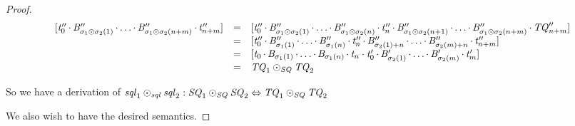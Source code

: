 \documentclass[acmsmall]{acmart}
\begin{document}
\begin{proof}
  \[
    \begin{array}{rcl}
      \SequenceOf{\StringAlt_0'' \SeqSep \AtomAlt_{\ConcatPermutationOf{\sigma_1}{\sigma_2}(1)}'' \SeqSep \ldots \SeqSep 
      \AtomAlt_{\ConcatPermutationOf{\sigma_1}{\sigma_2}(n+m)}'' \SeqSep \StringAlt_{n+m}''}
      & = &
            \SequenceOf{\StringAlt_0'' \SeqSep \AtomAlt_{\ConcatPermutationOf{\sigma_1}{\sigma_2}(1)}'' \SeqSep 
            \ldots \SeqSep \AtomAlt_{\ConcatPermutationOf{\sigma_1}{\sigma_2}(n)}'' \SeqSep 
            \StringAlt_n'' \SeqSep \AtomAlt_{\ConcatPermutationOf{\sigma_1}{\sigma_2}(n+1)}'' \SeqSep 
            \ldots \SeqSep 
            \AtomAlt_{\ConcatPermutationOf{\sigma_1}{\sigma_2}(n+m)}'' \SeqSep \SequenceAlt_{n+m}''}\\
      & = &
            \SequenceOf{\StringAlt_0'' \SeqSep \AtomAlt_{\sigma_1(1)}'' \SeqSep 
            \ldots \SeqSep \AtomAlt_{\sigma_1(n)}'' \SeqSep 
            \StringAlt_n'' \SeqSep \AtomAlt_{\sigma_2(1)+n}'' \SeqSep 
            \ldots \SeqSep 
            \AtomAlt_{\sigma_2(m)+n}'' \SeqSep \StringAlt_{n+m}''}\\
      & = &
            \SequenceOf{\StringAlt_0 \SeqSep \AtomAlt_{\sigma_1(1)} \SeqSep 
            \ldots \SeqSep \AtomAlt_{\sigma_1(n)} \SeqSep 
            \StringAlt_n\Concat\StringAlt_0' \SeqSep \AtomAlt_{\sigma_2(1)}' \SeqSep 
            \ldots \SeqSep 
            \AtomAlt_{\sigma_2(m)}' \SeqSep \StringAlt_m'}\\
      & = & \ConcatSequenceOf{\SequenceAlt_1}{\SequenceAlt_2}
    \end{array}
  \]

  So we have a derivation of $\mathit{sql}_1\odot_{\mathit{sql}}\mathit{sql}_2 :
  \mathit{SQ}_1\odot_{\mathit{SQ}}\mathit{SQ}_2 \Leftrightarrow
  \mathit{TQ}_1\odot_{\mathit{SQ}}\mathit{TQ}_2$

  We also wish to have the desired semantics.


\end{proof}
\end{document}
